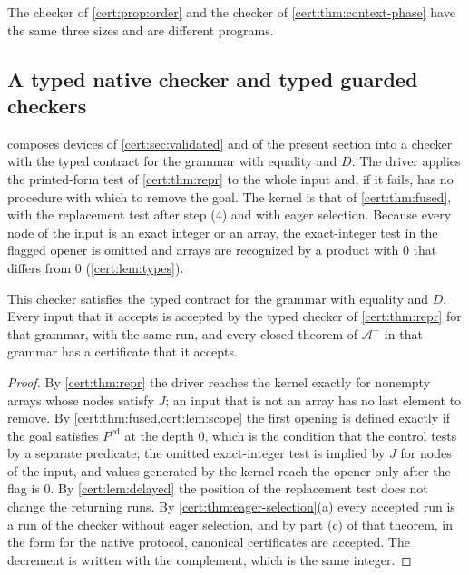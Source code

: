 The checker of \cref{cert:prop:order} and the checker of
\cref{cert:thm:context-phase} have the same three sizes and are different
programs.

\subsection{A typed native checker and typed guarded checkers}

 composes devices of \cref{cert:sec:validated} and
of the present section into a checker with the typed contract for the grammar
with equality and $D$. The driver applies the printed-form test of
\cref{cert:thm:repr} to the whole input and, if it fails, has no procedure
with which to remove the goal. The kernel is that of \cref{cert:thm:fused},
with the replacement test after step (4) and with eager selection. Because
every node of the input is an exact integer or an array, the exact-integer
test in the flagged opener is omitted and arrays are recognized by a product
with $0$ that differs from $0$ (\cref{cert:lem:types}).

\begin{theorem}\label{cert:thm:typed-native}
This checker satisfies the typed contract for the grammar with equality and
$D$. Every input that it accepts is accepted by the typed checker of
\cref{cert:thm:repr} for that grammar, with the same run, and every closed
theorem of $\mathcal A^{-}$ in that grammar has a certificate that it accepts.
\end{theorem}
\begin{proof}
By \cref{cert:thm:repr} the driver reaches the kernel exactly for nonempty
arrays whose nodes satisfy $J$; an input that is not an array has no last
element to remove. By \cref{cert:thm:fused,cert:lem:scope} the first opening
is defined exactly if the goal satisfies $P^{\mathrm{ed}}$ at the depth $0$,
which is the condition that the control tests by a separate predicate; the
omitted exact-integer test is implied by $J$ for nodes of the input, and
values generated by the kernel reach the opener only after the flag is $0$.
By \cref{cert:lem:delayed} the position of the replacement test does not
change the returning runs. By \cref{cert:thm:eager-selection}(a) every
accepted run is a run of the checker without eager selection, and by part
(c) of that theorem, in the form for the native protocol, canonical
certificates are accepted. The decrement is written with the complement,
which is the same integer.
\end{proof}

